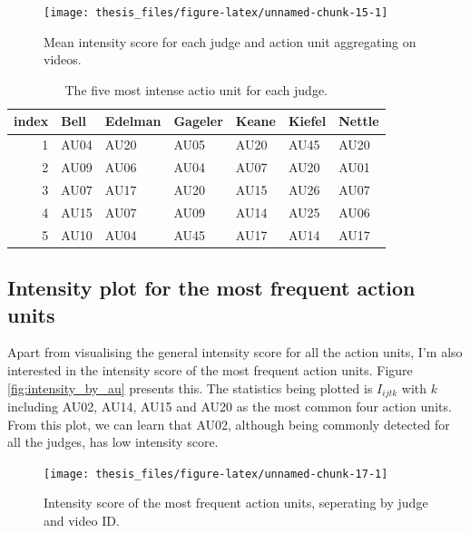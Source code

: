 \documentclass{monashthesis}
\begin{document}
\begin{figure}
\texttt{[image: thesis\_files/figure-latex/unnamed-chunk-15-1]} \caption{Mean intensity score for each judge and action unit aggregating on videos.\label{fig:mean_intensity}}\label{fig:unnamed-chunk-15}
\end{figure}

\begin{table}[t]

\caption{\label{tab:unnamed-chunk-16}\label{tab:most_intense}The five most intense actio unit for each judge.}
\centering
\begin{tabular}{r|l|l|l|l|l|l}
\hline
index & Bell & Edelman & Gageler & Keane & Kiefel & Nettle\\
\hline
1 & AU04 & AU20 & AU05 & AU20 & AU45 & AU20\\
\hline
2 & AU09 & AU06 & AU04 & AU07 & AU20 & AU01\\
\hline
3 & AU07 & AU17 & AU20 & AU15 & AU26 & AU07\\
\hline
4 & AU15 & AU07 & AU09 & AU14 & AU25 & AU06\\
\hline
5 & AU10 & AU04 & AU45 & AU17 & AU14 & AU17\\
\hline
\end{tabular}
\end{table}

\hypertarget{intensity-plot-for-the-most-frequent-action-units}{%
\subsection{Intensity plot for the most frequent action units}\label{intensity-plot-for-the-most-frequent-action-units}}

Apart from visualising the general intensity score for all the action units, I'm also interested in the intensity score of the most frequent action units. Figure \ref{fig:intensity_by_au} presents this. The statistics being plotted is \(I_{ijtk}\) with \(k\) including AU02, AU14, AU15 and AU20 as the most common four action units. From this plot, we can learn that AU02, although being commonly detected for all the judges, has low intensity score.

\begin{figure}
\texttt{[image: thesis\_files/figure-latex/unnamed-chunk-17-1]} \caption{Intensity score of the most frequent action units, seperating by judge and video ID.\label{fig:intensity_by_au}}\label{fig:unnamed-chunk-17}
\end{figure}
\end{document}
